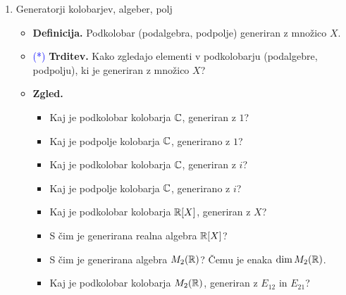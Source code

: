 \begin{enumerate}
    \item Generatorji kolobarjev, algeber, polj
    \begin{itemize}
        \item \textbf{Definicija.} Podkolobar (podalgebra, podpolje) generiran z množico \(X\).
        \item \textcolor{blue}{(*)} \textbf{Trditev.} Kako zgledajo elementi v podkolobarju (podalgebre, podpolju), ki je generiran z množico \(X\)?
        \item \textbf{Zgled.} \
        \begin{itemize}
            \item Kaj je podkolobar kolobarja $\mathbb{C}$, generiran z $1$?
            \item Kaj je podpolje kolobarja $\mathbb{C}$, generirano z $1$?
            \item Kaj je podkolobar kolobarja $\mathbb{C}$, generiran z $i$?
            \item Kaj je podpolje kolobarja $\mathbb{C}$, generirano z $i$?
            \item Kaj je podkolobar kolobarja $\mathbb{R}[X]$, generiran z $X$?
            \item S čim je generirana realna algebra $\mathbb{R}[X]$?
            \item S čim je generirana algebra $M_2(\mathbb{R})$? Čemu je enaka $\dim M_2(\mathbb{R})$.
            \item Kaj je podkolobar kolobarja $M_2(\mathbb{R})$, generiran z $E_{12}$ in $E_{21}$?
        \end{itemize}
    \end{itemize}
\end{enumerate}

\newpage
